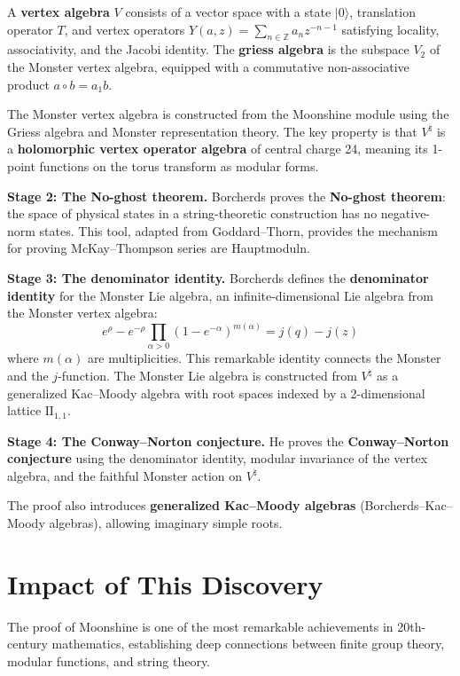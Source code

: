 A \textbf{vertex algebra} $V$ consists of a vector space with a
state $|0\rangle$, translation operator $T$, and vertex operators
$Y(a,z) = \sum_{n\in\mathbb{Z}}a_n z^{-n-1}$ satisfying locality,
associativity, and the Jacobi identity.  The \textbf{griess
algebra} is the subspace $V_2$ of the Monster vertex algebra,
equipped with a commutative non-associative product
$a\circ b = a_1 b$.

The Monster vertex algebra is constructed from the Moonshine module
using the Griess algebra and Monster representation theory.  The
key property is that $V^{\natural}$ is a \textbf{holomorphic vertex
operator algebra} of central charge 24, meaning its 1-point
functions on the torus transform as modular forms.

\textbf{Stage 2: The No-ghost theorem.}
Borcherds proves the \textbf{No-ghost theorem}: the space of
physical states in a string-theoretic construction has no
negative-norm states.  This tool, adapted from Goddard--Thorn,
provides the mechanism for proving McKay--Thompson series are
Hauptmoduln.

\textbf{Stage 3: The denominator identity.}
Borcherds defines the \textbf{denominator identity} for the Monster
Lie algebra, an infinite-dimensional Lie algebra from the Monster
vertex algebra:
\[
  e^{\rho} - e^{-\rho}
  \prod_{\alpha>0}(1-e^{-\alpha})^{m(\alpha)}
  = j(q) - j(z)
\]
where $m(\alpha)$ are multiplicities.  This remarkable identity
connects the Monster and the $j$-function.  The Monster Lie algebra
is constructed from $V^{\natural}$ as a generalized Kac--Moody
algebra with root spaces indexed by a 2-dimensional lattice
$\mathrm{II}_{1,1}$.

\textbf{Stage 4: The Conway--Norton conjecture.}
He proves the \textbf{Conway--Norton conjecture} using the
denominator identity, modular invariance of the vertex algebra, and
the faithful Monster action on $V^{\natural}$.

The proof also introduces \textbf{generalized Kac--Moody algebras}
(Borcherds--Kac--Moody algebras), allowing imaginary simple roots.

\section{Impact of This Discovery}

The proof of Moonshine is one of the most remarkable achievements
in 20th-century mathematics, establishing deep connections between
finite group theory, modular functions, and string theory.

